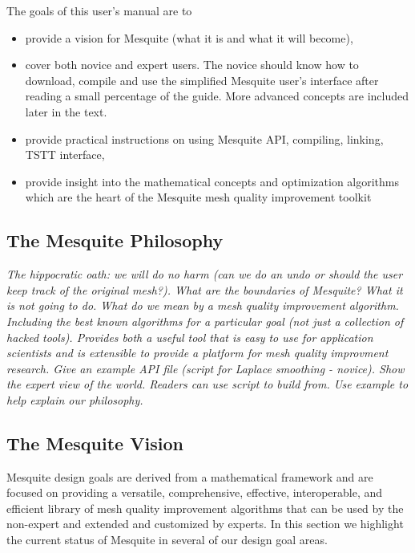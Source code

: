 \documentclass[psfig]{article}
\begin{document}
The goals of this user's manual are to
\begin{itemize}
\item provide a vision for Mesquite (what it is and what it will become),
\item cover both novice and expert users. The novice should know how to
download, compile and use the simplified Mesquite user's interface
after reading a small percentage of the guide. More 
advanced concepts are included later in the text.
\item provide practical instructions on using Mesquite API, compiling,
linking, TSTT interface,
\item provide insight into the mathematical concepts and optimization 
algorithms which are the heart of the Mesquite mesh quality improvement 
toolkit
\end{itemize}

\subsection{The Mesquite Philosophy}

{\it 
The hippocratic oath: we will do no harm (can we do an undo or
should the user keep track of the original mesh?).  What are the
boundaries of Mesquite?  What it is not going to do. What do we mean
by a mesh quality improvement algorithm. Including the best known
algorithms for a particular goal (not just a collection of hacked
tools). Provides both a useful tool that is easy to use for
application scientists and is extensible to provide a platform for
mesh quality improvment research. Give an example API file (script for
Laplace smoothing - novice). Show the expert view of the
world. Readers can use script to build from. Use example to help
explain our philosophy. 
}

\subsection{The Mesquite Vision}

Mesquite design goals are derived from a mathematical framework and
are focused on providing a versatile, comprehensive, effective,
interoperable, and efficient library of mesh quality improvement
algorithms that can be used by the non-expert and extended and
customized by experts.  In this section we highlight the current
status of Mesquite in several of our design goal areas.
\end{document}
